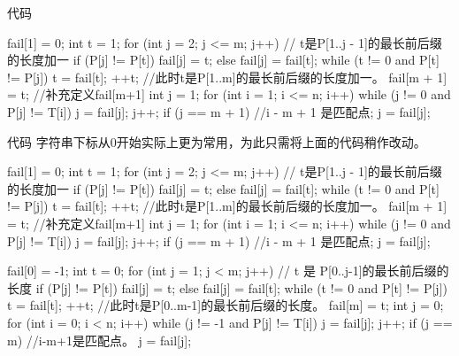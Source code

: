 \documentclass{ctexbeamer}
\begin{document}
\begin{frame}[fragile]{代码}
\begin{tcolorbox}
\begin{cverb}
fail[1] = 0;
int t = 1;
for (int j = 2; j <= m; j++) {
// t是P[1..j - 1]的最长前后缀的长度加一
  if (P[j] != P[t])
    fail[j] = t;
  else
    fail[j] = fail[t];
  while (t != 0 and P[t] != P[j])
    t = fail[t];
  ++t;
}
//此时t是P[1..m]的最长前后缀的长度加一。
fail[m + 1] = t; //补充定义fail[m+1]
int j = 1;
for (int i = 1; i <= n; i++) {
  while (j != 0 and P[j] != T[i])
    j = fail[j];
  j++;
  if (j == m + 1) {
    //i - m + 1 是匹配点;
    j = fail[j];
  }
}
\end{cverb}
\end{tcolorbox}

\end{frame}


\begin{frame}[fragile]{代码}
字符串下标从$0$开始实际上更为常用，为此只需将上面的代码稍作改动。

\begin{tcolorbox}[sidebyside]
\begin{cverb}
fail[1] = 0;
int t = 1;
for (int j = 2; j <= m; j++) {
// t是P[1..j - 1]的最长前后缀的长度加一
  if (P[j] != P[t])
    fail[j] = t;
  else
    fail[j] = fail[t];
  while (t != 0 and P[t] != P[j])
    t = fail[t];
  ++t;
}
//此时t是P[1..m]的最长前后缀的长度加一。
fail[m + 1] = t; //补充定义fail[m+1]
int j = 1;
for (int i = 1; i <= n; i++) {
  while (j != 0 and P[j] != T[i])
    j = fail[j];
  j++;
  if (j == m + 1) {
    //i - m + 1 是匹配点;
    j = fail[j];
  }
}
\end{cverb}
\tcblower
\begin{cverb}[fontsize=\tiny]
fail[0] = -1;
int t = 0;
for (int j = 1; j < m; j++) {
// t 是 P[0..j-1]的最长前后缀的长度
  if (P[j] != P[t])
    fail[j] = t;
  else
    fail[j] = fail[t];
  while (t != 0 and P[t] != P[j])
    t = fail[t];
  ++t;
}
//此时t是P[0..m-1]的最长前后缀的长度。
fail[m] = t;
int j = 0;
for (int i = 0; i < n; i++) {
  while (j != -1 and P[j] != T[i])
    j = fail[j];
  j++;
  if (j == m) {
    //i-m+1是匹配点。
    j = fail[j];
  }
}
\end{cverb}
\end{tcolorbox}

\end{frame}
\end{document}
